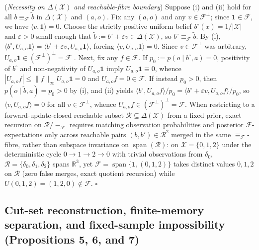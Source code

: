 \documentclass[12pt,letterpaper]{article}
\begin{document}
(\emph{Necessity on \(\Delta(\mathcal{X})\) and reachable-fibre
boundary}) Suppose (i) and (ii) hold for all
\(b \equiv_{\mathcal{F}} \tilde{b}\) in \(\Delta(\mathcal{X})\) and
\((a,o)\). Fix any \((a,o)\) and any \(v \in \mathcal{F}^\perp\); since
\(\mathbf{1} \in \mathcal{F}\), we have
\(\langle v, \mathbf{1}\rangle = 0\). Choose the strictly positive
uniform belief \(b^\circ(x) = 1/|\mathcal{X}|\) and \(\varepsilon > 0\)
small enough that
\(\tilde{b} := b^\circ + \varepsilon v \in \Delta(\mathcal{X})\), so
\(b^\circ \equiv_{\mathcal{F}} \tilde{b}\). By (i),
\(\langle b^\circ, U_{a,o}\mathbf{1}\rangle = \langle b^\circ + \varepsilon v, U_{a,o}\mathbf{1}\rangle\),
forcing \(\langle v, U_{a,o}\mathbf{1}\rangle = 0\). Since
\(v \in \mathcal{F}^\perp\) was arbitrary,
\(U_{a,o}\mathbf{1} \in (\mathcal{F}^\perp)^\perp = \mathcal{F}\)
\citep{poupartBoutilier2003}. Next, fix any \(f \in \mathcal{F}\). If
\(p_0 := p(o \mid b^\circ, a) = 0\), positivity of \(b^\circ\) and
non-negativity of \(U_{a,o}\mathbf{1}\) imply
\(U_{a,o}\mathbf{1} \equiv 0\), whence
\(|U_{a,o}f| \le \|f\|_\infty U_{a,o}\mathbf{1} = 0\) and
\(U_{a,o}f = 0 \in \mathcal{F}\). If instead \(p_0 > 0\), then
\(p(o \mid \tilde{b}, a) = p_0 > 0\) by (i), and (ii) yields
\(\langle b^\circ, U_{a,o}f\rangle / p_0 = \langle b^\circ + \varepsilon v, U_{a,o}f\rangle / p_0\),
so \(\langle v, U_{a,o}f\rangle = 0\) for all
\(v \in \mathcal{F}^\perp\), whence
\(U_{a,o}f \in (\mathcal{F}^\perp)^\perp = \mathcal{F}\). When
restricting to a forward-update-closed reachable subset
\(\mathcal{R} \subseteq \Delta(\mathcal{X})\) from a fixed prior, exact
recursion on \(\mathcal{R}/{\equiv_{\mathcal{F}}}\) requires matching
observation probabilities and posterior \(\mathcal{F}\)-expectations
only across reachable pairs \((b, b') \in \mathcal{R}^2\) merged in the
same \(\equiv_{\mathcal{F}}\)-fibre, rather than subspace invariance on
\(\operatorname{span}(\mathcal{R})\): on \(\mathcal{X}=\{0,1,2\}\) under
the deterministic cycle \(0 \to 1 \to 2 \to 0\) with trivial
observations from \(\delta_0\),
\(\mathcal{R}=\{\delta_0,\delta_1,\delta_2\}\) spans \(\mathbb{R}^3\),
yet \(\mathcal{F}=\operatorname{span}\{\mathbf{1},(0,1,2)\}\) takes
distinct values \(0,1,2\) on \(\mathcal{R}\) (zero false merges, exact
quotient recursion) while \(U(0,1,2) = (1,2,0) \notin \mathcal{F}\).
\(\square\)

\subsection{Cut-set reconstruction, finite-memory separation, and
fixed-sample impossibility (Propositions 5, 6, and
7)}\label{cut-set-reconstruction-finite-memory-separation-and-fixed-sample-impossibility-propositions-5-6-and-7}
\end{document}

